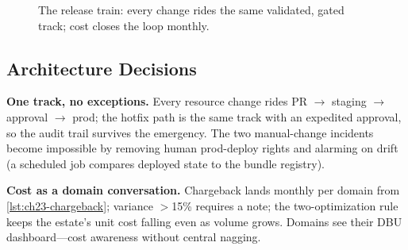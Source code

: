 \begin{figure}[H]
    \centering
    \caption{The release train: every change rides the same validated, gated track; cost closes the loop monthly.}
    \label{fig:ch23-train}
\end{figure}

\subsection{Architecture Decisions}
\textbf{One track, no exceptions.} Every resource change rides PR $\rightarrow$ staging $\rightarrow$ approval $\rightarrow$ prod; the hotfix path is the same track with an expedited approval, so the audit trail survives the emergency. The two manual-change incidents become impossible by removing human prod-deploy rights and alarming on drift (a scheduled job compares deployed state to the bundle registry).

\textbf{Cost as a domain conversation.} Chargeback lands monthly per domain from \cref{lst:ch23-chargeback}; variance $>$15\% requires a note; the two-optimization rule keeps the estate's unit cost falling even as volume grows. Domains see their DBU dashboard---cost awareness without central nagging.

